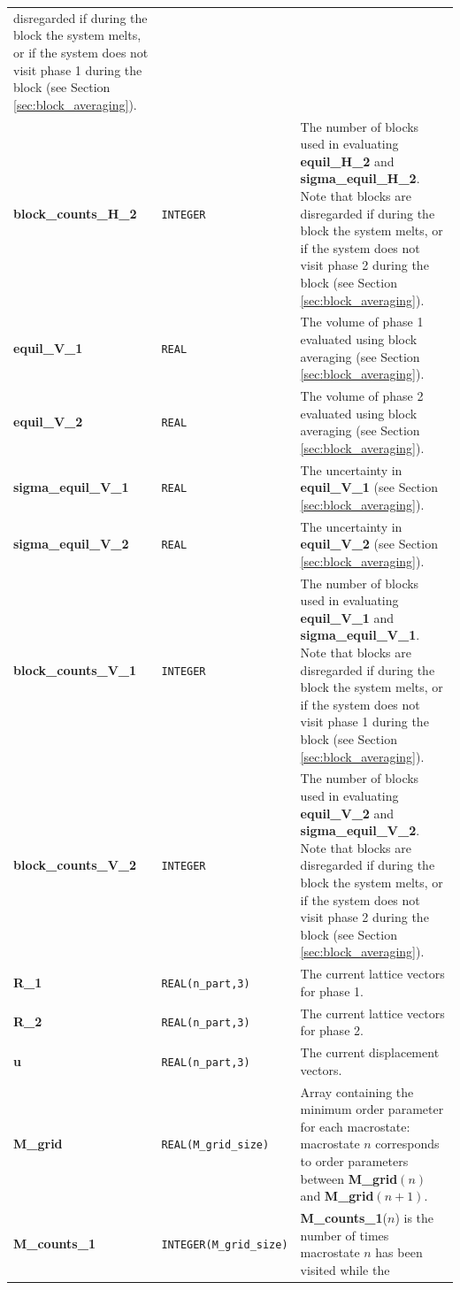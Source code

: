 \documentclass{report}
\begin{document}
\begin{landscape}
\begin{center}
\begin{longtable}{ l l p{8cm}}
disregarded if during the block the system melts, or if the system does not visit phase 1 during the block  (see Section \ref{sec:block_averaging}). \\
\textbf{block\_counts\_H\_2} & \texttt{INTEGER} &  The number of blocks used in evaluating \textbf{equil\_H\_2} and \textbf{sigma\_equil\_H\_2}. Note that blocks are
disregarded if during the block the system melts, or if the system does not visit phase 2 during the block  (see Section \ref{sec:block_averaging}). \\
\textbf{equil\_V\_1} & \texttt{REAL} & The volume of phase 1 evaluated using block averaging (see Section \ref{sec:block_averaging}).\\
\textbf{equil\_V\_2} & \texttt{REAL} & The volume of phase 2 evaluated using block averaging (see Section \ref{sec:block_averaging}).\\
\textbf{sigma\_equil\_V\_1} & \texttt{REAL} &  The uncertainty in \textbf{equil\_V\_1} (see Section \ref{sec:block_averaging}).\\
\textbf{sigma\_equil\_V\_2} & \texttt{REAL} &  The uncertainty in \textbf{equil\_V\_2} (see Section \ref{sec:block_averaging}).\\
\textbf{block\_counts\_V\_1} & \texttt{INTEGER} & The number of blocks used in evaluating \textbf{equil\_V\_1} and \textbf{sigma\_equil\_V\_1}. Note that blocks are
disregarded if during the block the system melts, or if the system does not visit phase 1 during the block  (see Section \ref{sec:block_averaging}). \\
\textbf{block\_counts\_V\_2} & \texttt{INTEGER} &  The number of blocks used in evaluating \textbf{equil\_V\_2} and \textbf{sigma\_equil\_V\_2}. Note that blocks are
disregarded if during the block the system melts, or if the system does not visit phase 2 during the block (see Section \ref{sec:block_averaging}). \\
\textbf{R\_1} & \texttt{REAL(n\_part,3)} & The current lattice vectors for phase 1. \\
\textbf{R\_2} & \texttt{REAL(n\_part,3)} & The current lattice vectors for phase 2.\\
\textbf{u} & \texttt{REAL(n\_part,3)} & The current displacement vectors.\\
\textbf{M\_grid} & \texttt{REAL(M\_grid\_size)} & Array containing the minimum order parameter for each macrostate: macrostate $n$ corresponds to 
order parameters between \textbf{M\_grid}$(n)$ and \textbf{M\_grid}$(n+1)$.\\
\textbf{M\_counts\_1} & \texttt{INTEGER(M\_grid\_size)} & \textbf{M\_counts\_1}($n$) is the number of times macrostate $n$ has been visited while the

\end{longtable}
\end{center}
\end{landscape}
\end{document}
